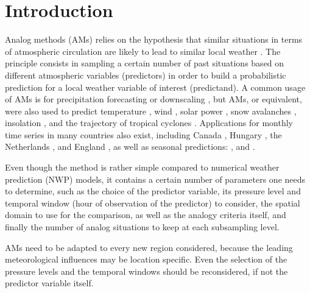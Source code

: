 \documentclass{ametsoc}
\begin{document}


\section{Introduction}
\label{section_intro}

Analog methods (AMs) relies on the hypothesis that similar situations in terms of atmospheric circulation are likely to lead to similar local weather \citep{Lorenz1956, Lorenz1969, Duband1970, Bontron2005}. The principle consists in sampling a certain number of past situations based on different atmospheric variables (predictors) in order to build a probabilistic prediction for a local weather variable of interest (predictand). A common usage of AMs is for precipitation forecasting or downscaling \citep[eg.][]{Guilbaud1997, Bontron2005, Hamill2006, Bliefernicht2010, Marty2012, Horton2012, Radanovics2013, Chardon2014, Dayon2015, Hamill2015b, BenDaoud2016}, but AMs, or equivalent, were also used to predict temperature \citep{Radinovic1975, Woodcock1980, Kruizinga1983, DelleMonache2013, Caillouet2016}, wind \citep{Gordon1987, DelleMonache2013, DelleMonache2011, Vanvyve2015, Alessandrini2015, Junk2015, Junk2015c}, solar power \citep{Alessandrini2015a, Bessa2015}, snow avalanches \citep{Obled1980, Bolognesi1993}, insolation \citep{Bois1981}, and the trajectory of tropical cyclones \citep{Keenan1981, Sievers2000, Fraedrich2003}. Applications for monthly time series in many countries also exist, including Canada \citep{Shabbar1986},  Hungary \citep{Toth1989}, the Netherlands \citep{Nap1981}, and England \citep{Murray1974}, as well as seasonal predictions: \citet{Barnett1978}, \citet{Bergen1982} and \citet{Livezey1988}.

Even though the method is rather simple compared to numerical weather prediction (NWP) models, it contains a certain number of parameters one needs to determine, such as the choice of the predictor variable, its pressure level and temporal window (hour of observation of the predictor) to consider, the spatial domain to use for the comparison, as well as the analogy criteria itself, and finally the number of analog situations to keep at each subsampling level. 

AMs need to be adapted to every new region considered, because the leading meteorological influences may be location specific. Even the selection of the pressure levels and the temporal windows should be reconsidered, if not the predictor variable itself. 
\end{document}
